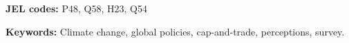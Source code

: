 \begin{abstract}
\end{abstract}

\textbf{JEL codes:} P48, Q58, H23, Q54 %

\textbf{Keywords:} Climate change, global policies, cap-and-trade, perceptions, survey.%

